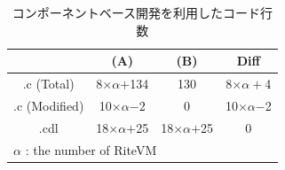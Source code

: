 \documentclass[submit,techrep]{ipsj}
\begin{document}
\begin{table}[t]
    \centering
    \caption{コンポーネントベース開発を利用したコード行数} 
    \begin{tabular}{c||cc|c}
                & (A)       & (B)     & Diff  \\ \hline
        .c (Total)      & 8$\times$$\alpha$$+$134  & 130     & 8$\times$$\alpha+$4\\
        .c (Modified)   & 10$\times\alpha$$-$2 & 0   &  10$\times\alpha$$-$2 \\
        .cdl    & 18$\times$$\alpha$$+$25   & 18$\times$$\alpha$$+$25 & 0     \\
        \multicolumn{3}{l}{{\small $\alpha$} : {\scriptsize the number of RiteVM}}
    \end{tabular}
    \vspace{-3mm}
    \label{tab:codesize}
\end{table}

\vspace{-2mm}
\end{document}
